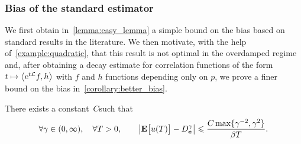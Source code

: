 \documentclass[11pt,a4paper]{article}
\begin{document}
\subsubsection{Bias of the standard estimator}%
\label{ssub:bias_of_the_standard_estimator}

We first obtain in~\cref{lemma:easy_lemma} a simple bound on the bias based on standard results in the literature.
We then motivate, with the help of~\cref{example:quadratic},
that this result is not optimal in the overdamped regime and,
after obtaining a decay estimate for correlation functions of the form $t \mapsto \ip{\e^{t \mathcal L} f}{h}$ with $f$ and $h$ functions depending only on $p$,
we prove a finer bound on the bias in~\cref{corollary:better_bias}.

\begin{lemma}
    \label{lemma:easy_lemma}
    There exists a constant~$C$such that
    \begin{equation}
        \label{eq:bias_simple}
        \forall \gamma \in (0, \infty),
        \quad
        \forall T > 0,
        \qquad
        \abs{\expect \bigl[u(T)\bigr] - D_{\vect e}^{\gamma}}
        \leq
        \frac{C \max \{\gamma^{-2}, \gamma^2\}}{\beta T}.
    \end{equation}
\end{lemma}
\end{document}
